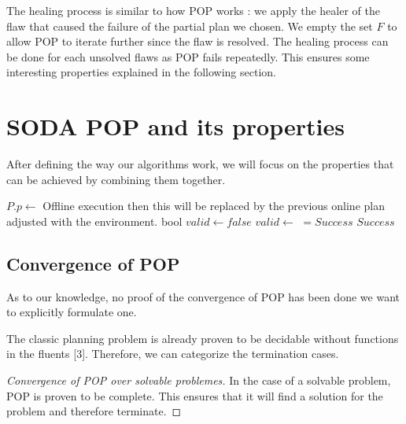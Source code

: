 \documentclass[]{article}
\begin{document}
The healing process is similar to how POP works : we apply the healer of
the flaw that caused the failure of the partial plan we chosen. We empty
the set \(F\) to allow POP to iterate further since the flaw is
resolved. The healing process can be done for each unsolved flaws as POP
fails repeatedly. This ensures some interesting properties explained in
the following section.

\hypertarget{soda}{\section{SODA POP and its properties}\label{soda}}

After defining the way our algorithms work, we will focus on the
properties that can be achieved by combining them together.

\begin{algorithm}\caption{Combining all algorithms into SODA POP}\label{soda}\begin{algorithmic}[1]

 \State \(P.p \gets\)
 \Comment Offline execution then this
will be replaced by the previous online plan adjusted with the
environment. \State {} \State bool \(valid \gets false\)
 \State \(valid \gets\) 
\(= Success\)  \State {}
\State \Return \(Success\) \EndIf
        \State {} \EndWhile
\EndFunction

\end{algorithmic}\end{algorithm}

\subsection{Convergence of POP}\label{convergence}

As to our knowledge, no proof of the convergence of POP has been done we
want to explicitly formulate one.

The classic planning problem is already proven to be decidable without
functions in the fluents {[}3{]}. Therefore, we can categorize the
termination cases.

\begin{proof}[Convergence of POP over solvable problemes]

In the case of a solvable problem, POP is proven to be complete. This
ensures that it will find a solution for the problem and therefore
terminate.

\end{proof}
\end{document}
